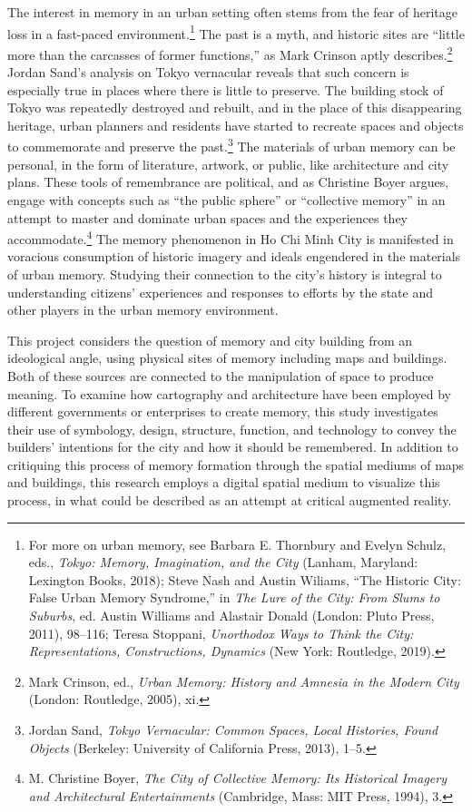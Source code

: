 The interest in memory in an urban setting often stems from the fear of heritage loss in a fast-paced environment.\footnote{For more on urban memory, see Barbara E. Thornbury and Evelyn Schulz, eds., \textit{Tokyo: Memory, Imagination, and the City} (Lanham, Maryland: Lexington Books, 2018); Steve Nash and Austin Wiliams, “The Historic City: False Urban Memory Syndrome,” in \textit{The Lure of the City: From Slums to Suburbs}, ed. Austin Williams and Alastair Donald (London: Pluto Press, 2011), 98–116; Teresa Stoppani, \textit{Unorthodox Ways to Think the City: Representations, Constructions, Dynamics} (New York: Routledge, 2019).} The past is a myth, and historic sites are “little more than the carcasses of former functions,” as Mark Crinson aptly describes.\footnote{Mark Crinson, ed., \textit{Urban Memory: History and Amnesia in the Modern City} (London: Routledge, 2005), xi.} Jordan Sand’s analysis on Tokyo vernacular reveals that such concern is especially true in places where there is little to preserve. The building stock of Tokyo was repeatedly destroyed and rebuilt, and in the place of this disappearing heritage, urban planners and residents have started to recreate spaces and objects to commemorate and preserve the past.\footnote{Jordan Sand, \textit{Tokyo Vernacular: Common Spaces, Local Histories, Found Objects} (Berkeley: University of California Press, 2013), 1–5.} The materials of urban memory can be personal, in the form of literature, artwork, or public, like architecture and city plans. These tools of remembrance are political, and as Christine Boyer argues, engage with concepts such as “the public sphere” or “collective memory” in an attempt to master and dominate urban spaces and the experiences they accommodate.\footnote{M. Christine Boyer, \textit{The City of Collective Memory: Its Historical Imagery and Architectural Entertainments} (Cambridge, Mass: MIT Press, 1994), 3.} The memory phenomenon in Ho Chi Minh City is manifested in voracious consumption of historic imagery and ideals engendered in the materials of urban memory. Studying their connection to the city’s history is integral to understanding citizens’ experiences and responses to efforts by the state and other players in the urban memory environment.

This project considers the question of memory and city building from an ideological angle, using physical sites of memory including maps and buildings. Both of these sources are connected to the manipulation of space to produce meaning. To examine how cartography and architecture have been employed by different governments or enterprises to create memory, this study investigates their use of symbology, design, structure, function, and technology to convey the builders’ intentions for the city and how it should be remembered. In addition to critiquing this process of memory formation through the spatial mediums of maps and buildings, this research employs a digital spatial medium to visualize this process, in what could be described as an attempt at critical augmented reality.

